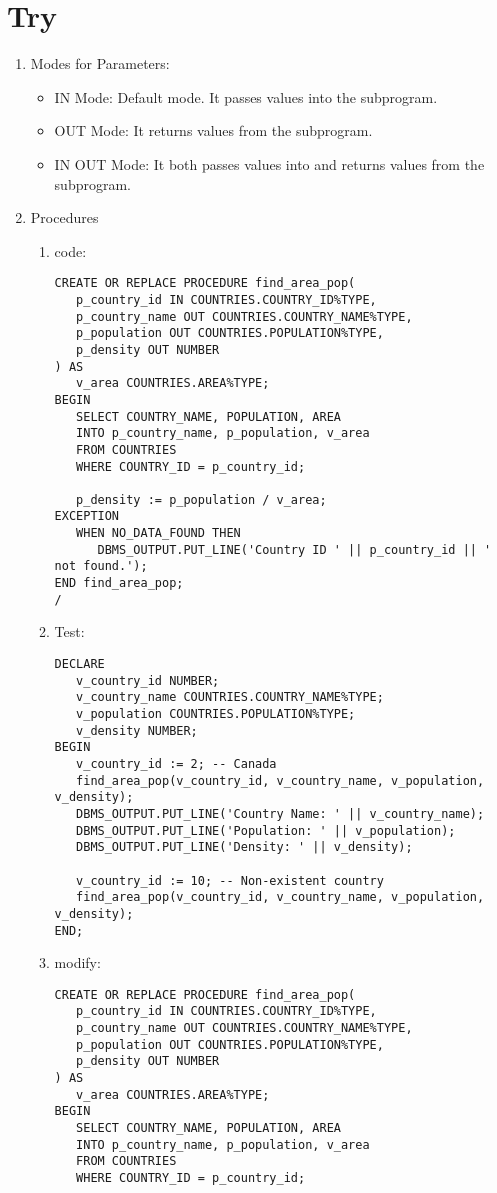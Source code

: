 \documentclass[11pt]{article}
\begin{document}
\section{Try}
\label{sec:orgeb420b9}
\begin{enumerate}
\item Modes for Parameters:
\begin{itemize}
\item IN Mode: Default mode. It passes values into the subprogram.
\item OUT Mode: It returns values from the subprogram.
\item IN OUT Mode: It both passes values into and returns values from the subprogram.
\end{itemize}
\item Procedures
\begin{enumerate}
\item code:
\begin{verbatim}
CREATE OR REPLACE PROCEDURE find_area_pop(
   p_country_id IN COUNTRIES.COUNTRY_ID%TYPE,
   p_country_name OUT COUNTRIES.COUNTRY_NAME%TYPE,
   p_population OUT COUNTRIES.POPULATION%TYPE,
   p_density OUT NUMBER
) AS
   v_area COUNTRIES.AREA%TYPE;
BEGIN
   SELECT COUNTRY_NAME, POPULATION, AREA
   INTO p_country_name, p_population, v_area
   FROM COUNTRIES
   WHERE COUNTRY_ID = p_country_id;

   p_density := p_population / v_area;
EXCEPTION
   WHEN NO_DATA_FOUND THEN
      DBMS_OUTPUT.PUT_LINE('Country ID ' || p_country_id || ' not found.');
END find_area_pop;
/
\end{verbatim}

\item Test:
\begin{verbatim}
DECLARE
   v_country_id NUMBER;
   v_country_name COUNTRIES.COUNTRY_NAME%TYPE;
   v_population COUNTRIES.POPULATION%TYPE;
   v_density NUMBER;
BEGIN
   v_country_id := 2; -- Canada
   find_area_pop(v_country_id, v_country_name, v_population, v_density);
   DBMS_OUTPUT.PUT_LINE('Country Name: ' || v_country_name);
   DBMS_OUTPUT.PUT_LINE('Population: ' || v_population);
   DBMS_OUTPUT.PUT_LINE('Density: ' || v_density);

   v_country_id := 10; -- Non-existent country
   find_area_pop(v_country_id, v_country_name, v_population, v_density);
END;
\end{verbatim}

\item modify:
\begin{verbatim}
CREATE OR REPLACE PROCEDURE find_area_pop(
   p_country_id IN COUNTRIES.COUNTRY_ID%TYPE,
   p_country_name OUT COUNTRIES.COUNTRY_NAME%TYPE,
   p_population OUT COUNTRIES.POPULATION%TYPE,
   p_density OUT NUMBER
) AS
   v_area COUNTRIES.AREA%TYPE;
BEGIN
   SELECT COUNTRY_NAME, POPULATION, AREA
   INTO p_country_name, p_population, v_area
   FROM COUNTRIES
   WHERE COUNTRY_ID = p_country_id;


\end{verbatim}
\end{enumerate}
\end{enumerate}
\end{document}
